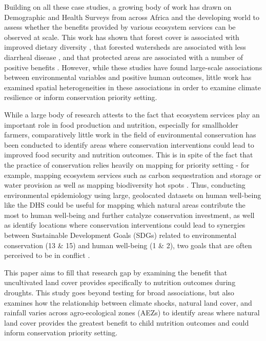 \documentclass{article}
\begin{document}
Building on all these case studies, a growing body of work has drawn on Demographic and Health Surveys from across Africa and the developing world to assess whether the benefits provided by various ecosystem services can be observed at scale.  This work has shown that forest cover is associated with improved dietary diversity \cite{Ickowitz2014, Rasolofoson2018}, that forested watersheds are associated with less diarrheal disease \cite{Herrera2017}, and that protected areas are associated with a number of positive benefits \cite{naidoo2019evaluating}.  However, while these studies have found large-scale associations between environmental variables and positive human outcomes, little work has examined spatial heterogeneities in these associations in order to examine climate resilience or inform conservation priority setting.

While a large body of research attests to the fact that ecosystem services play an important role in food production and nutrition, especially for smallholder farmers, comparatively little work in the field of environmental conservation has been conducted to identify areas where conservation interventions could lead to improved food security and nutrition outcomes.  This is in spite of the fact that the practice of conservation relies heavily on mapping for priority setting - for example, mapping ecosystem services such as carbon sequestration and storage \cite{Kim2016} or water provision \cite{immerzeel2020importance} as well as mapping biodiversity hot spots \cite{holland2012conservation}.  Thus, conducting environmental epidemiology using large, geolocated datasets on human well-being like the DHS could be useful for mapping which natural areas contribute the most to human well-being and further catalyze conservation investment, as well as identify locations where conservation interventions could lead to synergies between Sustainable Development Goals (SDGs) related to environmental conservation (13 \& 15) and human well-being (1 \& 2), two goals that are often perceived to be in conflict \cite{moore2016improving, mcshane2011hard}.

This paper aims to fill that research gap by examining the benefit that uncultivated land cover provides specifically to nutrition outcomes during droughts.  This study goes beyond testing for broad associations, but also examines how the relationship between climate shocks, natural land cover, and rainfall varies across agro-ecological zones (AEZs) to identify areas where natural land cover provides the greatest benefit to child nutrition outcomes and could inform conservation priority setting.
\end{document}
